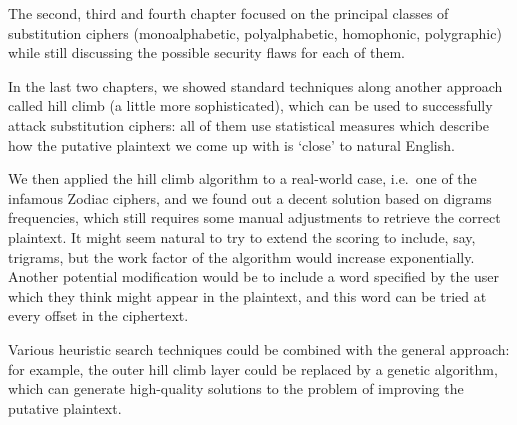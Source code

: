 \documentclass[Lau,binding=0.6cm,oneside]{sapthesis}
\begin{document}
The second, third and fourth chapter focused on the principal classes of substitution ciphers (monoalphabetic, polyalphabetic, homophonic, polygraphic) while still discussing the possible security flaws for each of them.

In the last two chapters, we showed standard techniques along another approach called hill climb (a little more sophisticated), which can be used to successfully attack substitution ciphers: all of them use statistical measures which describe how the putative plaintext we come up with is `close' to natural English.

We then applied the hill climb algorithm to a real-world case, i.e.\ one of the infamous Zodiac ciphers, and we found out a decent solution based on digrams frequencies, which still requires some manual adjustments to retrieve the correct plaintext. It might seem natural to try to extend the scoring to include, say, trigrams, but the work factor of the algorithm would increase exponentially. Another potential modification would be to include a word specified by the user which they think might appear in the plaintext, and this word can be tried at every offset in the ciphertext.

Various heuristic search techniques could be combined with the general approach: for example, the outer hill climb layer could be replaced by a genetic algorithm\supercite{geneticalgorithm}, which can generate high-quality solutions to the problem of improving the putative plaintext.
\end{document}
